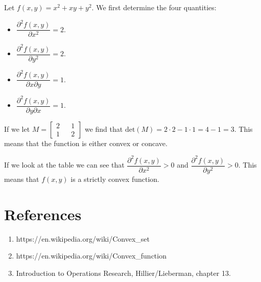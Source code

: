 \documentclass[11pt]{article}
\providecommand{\tightlist}{%
      \setlength{\itemsep}{0pt}\setlength{\parskip}{0pt}}
\begin{document}
    Let \(f(x,y)=x^2+xy+y^2\). We first determine the four quantities:

\begin{itemize}
\tightlist
\item
  \(\dfrac{\partial^2 f(x,y)}{\partial x^2} = 2\).
\item
  \(\dfrac{\partial^2 f(x,y)}{\partial y^2} = 2\).
\item
  \(\dfrac{\partial^2 f(x,y)}{\partial x \partial y} = 1\).
\item
  \(\dfrac{\partial^2 f(x,y)}{\partial y \partial x} = 1\).
\end{itemize}

If we let \(M=\begin{bmatrix} 2 && 1 \\ 1 && 2 \end{bmatrix}\) we find
that \(\textrm{det}(M)=2\cdot2-1\cdot1 = 4-1 = 3\). This means that the
function is either convex or concave.

If we look at the table we can see that
\(\dfrac{\partial^2 f(x,y)}{\partial x^2} > 0\) and
\(\dfrac{\partial^2 f(x,y)}{\partial y^2} > 0\). This means that
\(f(x,y)\) is a strictly convex function.

    \hypertarget{references}{%
\section{References}\label{references}}

    \begin{enumerate}
\def\labelenumi{\arabic{enumi}.}
\tightlist
\item
  https://en.wikipedia.org/wiki/Convex\_set
\item
  https://en.wikipedia.org/wiki/Convex\_function
\item
  Introduction to Operations Research, Hillier/Lieberman, chapter 13.
\end{enumerate}


    
    
    
    
\end{document}
